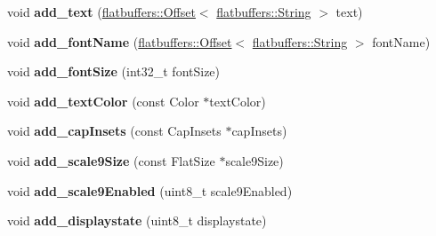 \begin{DoxyCompactItemize}
\item 
\mbox{\label{structflatbuffers_1_1ButtonOptionsBuilder_a98fe3566459700a935876968e3052456}} 
void {\bfseries add\+\_\+text} (\hyperlink{structflatbuffers_1_1Offset}{flatbuffers\+::\+Offset}$<$ \hyperlink{structflatbuffers_1_1String}{flatbuffers\+::\+String} $>$ text)
\item 
\mbox{\label{structflatbuffers_1_1ButtonOptionsBuilder_aaf49ecd246c6aaf3cf56a9e94da1dfa4}} 
void {\bfseries add\+\_\+font\+Name} (\hyperlink{structflatbuffers_1_1Offset}{flatbuffers\+::\+Offset}$<$ \hyperlink{structflatbuffers_1_1String}{flatbuffers\+::\+String} $>$ font\+Name)
\item 
\mbox{\label{structflatbuffers_1_1ButtonOptionsBuilder_af3706ffc6e93e52b12b9b454022ba517}} 
void {\bfseries add\+\_\+font\+Size} (int32\+\_\+t font\+Size)
\item 
\mbox{\label{structflatbuffers_1_1ButtonOptionsBuilder_aba57e003116e6c94a43265a7163b3203}} 
void {\bfseries add\+\_\+text\+Color} (const Color $\ast$text\+Color)
\item 
\mbox{\label{structflatbuffers_1_1ButtonOptionsBuilder_a7ab0e75806b80935ebe7dc4524e7952a}} 
void {\bfseries add\+\_\+cap\+Insets} (const Cap\+Insets $\ast$cap\+Insets)
\item 
\mbox{\label{structflatbuffers_1_1ButtonOptionsBuilder_a0471e4baf6093a1ef342deb3a60ab1b8}} 
void {\bfseries add\+\_\+scale9\+Size} (const Flat\+Size $\ast$scale9\+Size)
\item 
\mbox{\label{structflatbuffers_1_1ButtonOptionsBuilder_a01f51eb8393c6ac9b3e3ff91955cc0ea}} 
void {\bfseries add\+\_\+scale9\+Enabled} (uint8\+\_\+t scale9\+Enabled)
\item 
\mbox{\label{structflatbuffers_1_1ButtonOptionsBuilder_af0347b72c4c195ed667dd64f118992ad}} 
void {\bfseries add\+\_\+displaystate} (uint8\+\_\+t displaystate)

\end{DoxyCompactItemize}
